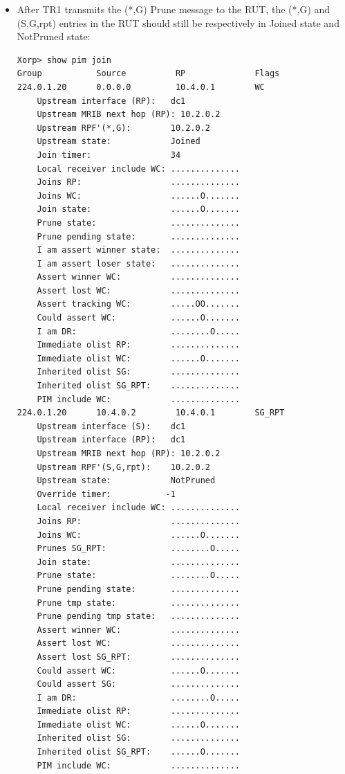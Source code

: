 \documentclass[11pt]{report}
\begin{document}
\begin{itemize}
  \item After TR1 transmits the (*,G) Prune message to the RUT, the (*,G) and
  (S,G,rpt) entries in the RUT should still be respectively in Joined state
  and NotPruned state:

\begin{verbatim}
Xorp> show pim join 
Group           Source          RP              Flags
224.0.1.20      0.0.0.0         10.4.0.1        WC   
    Upstream interface (RP):   dc1
    Upstream MRIB next hop (RP): 10.2.0.2
    Upstream RPF'(*,G):        10.2.0.2
    Upstream state:            Joined 
    Join timer:                34
    Local receiver include WC: ..............
    Joins RP:                  ..............
    Joins WC:                  ......O.......
    Join state:                ......O.......
    Prune state:               ..............
    Prune pending state:       ..............
    I am assert winner state:  ..............
    I am assert loser state:   ..............
    Assert winner WC:          ..............
    Assert lost WC:            ..............
    Assert tracking WC:        .....OO.......
    Could assert WC:           ......O.......
    I am DR:                   ........O.....
    Immediate olist RP:        ..............
    Immediate olist WC:        ......O.......
    Inherited olist SG:        ..............
    Inherited olist SG_RPT:    ..............
    PIM include WC:            ..............
224.0.1.20      10.4.0.2        10.4.0.1        SG_RPT 
    Upstream interface (S):    dc1
    Upstream interface (RP):   dc1
    Upstream MRIB next hop (RP): 10.2.0.2
    Upstream RPF'(S,G,rpt):    10.2.0.2
    Upstream state:            NotPruned 
    Override timer:           -1
    Local receiver include WC: ..............
    Joins RP:                  ..............
    Joins WC:                  ......O.......
    Prunes SG_RPT:             ........O.....
    Join state:                ..............
    Prune state:               ........O.....
    Prune pending state:       ..............
    Prune tmp state:           ..............
    Prune pending tmp state:   ..............
    Assert winner WC:          ..............
    Assert lost WC:            ..............
    Assert lost SG_RPT:        ..............
    Could assert WC:           ......O.......
    Could assert SG:           ..............
    I am DR:                   ........O.....
    Immediate olist RP:        ..............
    Immediate olist WC:        ......O.......
    Inherited olist SG:        ..............
    Inherited olist SG_RPT:    ......O.......
    PIM include WC:            ..............
\end{verbatim}


\end{itemize}
\end{document}
